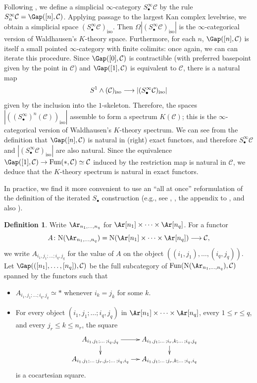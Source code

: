 \documentclass{amsart}
\newcommand{\ssdot}{\bullet}%
\newcommand{\Sdot}[1][\ssdot]{S_{#1}}
\newcommand{\iSdot}[1][\ssdot]{S^{\infty}_{#1}}
\let\sma\wedge
\newcommand{\htp}{\simeq}
\renewcommand{\to}{\mathchoice{\longrightarrow}{\rightarrow}{\rightarrow}{\rightarrow}}
\let\catsymbfont\mathcal
\newcommand{\aC}{{\catsymbfont{C}}}
\newcommand{\C}{\catsymbfont{C}}
\newcommand{\lkan}[1]{(#1)_{\mathrm{iso}}}
\newcommand{\N}{\mathrm{N}}
\newcommand{\Fun}{\mathrm{Fun}} %
\renewcommand{\i}{\infty}
\numberwithin{equation}{section}
\theoremstyle{definition}
\newtheorem{definition}[equation]{Definition}
\begin{document}
Following \cite[1.2.2.5]{HAG}, we define a simplicial $\i$-category
$\iSdot \aC$ by the rule $\iSdot[n] \C=\Gap([n],\aC)$.  Applying
passage to the largest Kan complex levelwise, we obtain a simplicial
space $\lkan{\iSdot \aC}$.  Then $\Omega |\lkan{\iSdot \aC}|$ is the
$\i$-categorical version of Waldhausen's $K$-theory space.
Furthermore, for each $n$, $\Gap([n],\aC)$ is itself a small pointed
$\i$-category with finite colimits: once again, we can can iterate
this procedure.  Since $\Gap([0],\aC)$ is contractible (with preferred
basepoint given by the point in $\aC$) and $\Gap([1],\aC)$ is
equivalent to $\aC$, there is a natural map 
\[
S^1 \sma \lkan{\aC} \to |\lkan{\iSdot \aC}|
\]
given by the inclusion into the $1$-skeleton.  Therefore, the spaces
$|\lkan{(\iSdot)^{n}(\aC)}|$ assemble to form a spectrum $K(\aC)$;
this is the $\i$-categorical version of Waldhausen's $K$-theory
spectrum.  We can see from the definition that $\Gap([n],\aC)$ is
natural in (right) exact functors, and therefore $\iSdot \aC$ and
$|\lkan{\iSdot \aC}|$ are also natural.  Since the equivalence
$\Gap([1],\aC) \to \Fun(*,\aC) \htp \aC$ induced by the restriction
map is natural in $\aC$, we deduce that the $K$-theory spectrum is
natural in exact functors.

In practice, we find it more convenient to use an ``all at once''
reformulation of the definition of the iterated $\Sdot$ construction
(e.g., see \cite[A.5.4]{BM4}, \cite[2.2]{BM5}, the appendix
to \cite{GeisserHesselholt}, and also \cite[\S 2]{Rognes}).

\begin{definition}\label{consitsdot}
Write $\Ar_{n_{1},\dotsc,n_{q}}$ for
$\Ar[n_{1}]\times \dotsb \times \Ar[n_{q}]$.  For a functor
\[
A\colon \N(\Ar_{n_{1},\dotsc,n_{q}})=\N(\Ar[n_{1}] \times \dotsb \times
\Ar[n_{q}])\to \aC,
\]
we write $A_{i_{1},j_{1};\dotsc;i_{q},j_{q}}$ for the value of $A$ on
the object $((i_{1},j_{1}),\dotsc,(i_{q},j_{q}))$.
Let $\Gap(([n_1],\dotsc,[n_q]), \aC)$ be the full subcategory of
$\Fun(\N(\Ar_{n_1,\dotsc,n_q}), \aC)$ spanned by the functors such that
\begin{itemize}
\item $A_{i_{1},j_{1};\dotsc;i_{q},j_{q}} \htp *$ whenever
$i_{k}=j_{k}$ for some $k$.
\item For every object
$(i_{1},j_{1};\dotsc;i_{q},j_{q})$ in $\Ar[n_{1}]\times \dotsb \times
\Ar[n_{q}]$, every $1\leq r\leq q$, and every $j_{r}\leq k\leq n_{r}$, the square
\[  \xymatrix@-1pc{%
A_{i_{1},j_{1};\dotsc;i_{q},j_{q}}\ar[r]\ar[d]
&A_{i_{1},j_{1};\dotsc;i_{r},k;\dotsc;i_{q},j_{q}}\ar[d]\\
A_{i_{1},j_{1};\dotsc;j_{r},j_{r};\dotsc;i_{q},i_{q}}\ar[r]
&A_{i_{1},j_{1};\dotsc;j_{r},k;\dotsc;i_{q},i_{q}}
} \]
is a cocartesian square.
\end{itemize}
\end{definition}
\end{document}
